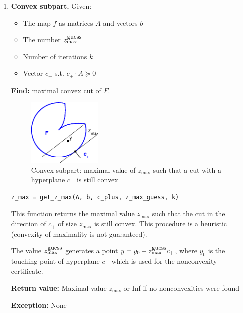 \documentclass[a4paper]{article}
\theoremstyle{definition}
\begin{document}
\begin{enumerate}
\begin{enumerate}
\end{enumerate}

\item {\bf Convex subpart.} Given:
\begin{itemize}
	\item The map $f$ as matrices $A$ and vectors $b$
	\item The number $z_{\max}^{\mbox{\small guess}}$
	\item Number of iterations $k$
	\item Vector $c_+$ s.t. $c_+\cdot A\succeq 0$
\end{itemize}

{\bf Find:} maximal convex cut of $F$.

\begin{figure}[H]
	\centering\includegraphics[width=100pt]{fig/get_z_max}
	\caption{Convex subpart: maximal value of $z_{\max}$ such that a cut with a hyperplane $c_+$ is still convex}
\end{figure}

\begin{verbatim}
z_max = get_z_max(A, b, c_plus, z_max_guess, k)
\end{verbatim}

This function returns the maximal value $z_{\max}$ such that the cut in the direction of $c_+$ of size $z_{\max}$ is still convex. This procedure is a heuristic (convexity of maximality is not guaranteed).

The value $z_{\max}^{\mbox{\small guess}}$ generates a point $y=y_0-z_{\max}^{\mbox{\small guess}}c_+$, where $y_0$ is the touching point of hyperplane $c_+$ which is used for the nonconvexity certificate.

{\bf Return value:} Maximal value $z_{\max}$ or Inf if no nonconvexities were found

{\bf Exception:} None
\end{enumerate}
\end{document}
